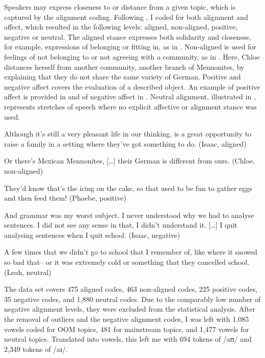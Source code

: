 \documentclass[output=paper]{langscibook}
\begin{document}
Speakers may express closeness to or distance from a given topic, which is captured by the alignment coding. Following \citet{nycz_stylistic_2018}, I coded for both alignment and affect, which resulted in the following levels: aligned, non-aligned, positive, negative or neutral. The aligned stance expresses both solidarity and closeness, for example, expressions of belonging or fitting in, as in . Non-aligned is used for feelings of not belonging to or not agreeing with a community, as in . Here, Chloe distances herself from another community, another branch of Mennonites, by explaining that they do not share the same variety of German. Positive and negative affect covers the evaluation of a described object. An example of positive affect is provided in  and of negative affect in . Neutral alignment, illustrated in , represents stretches of speech where no explicit affective or alignment stance was used.

\begin{exe}
    \ex\label{neuhausen:ex:4} Although it’s still a very pleasant life in our thinking, is a great opportunity to raise a family in a setting where they’ve got something to do. (Isaac, aligned)


    \ex\label{neuhausen:ex:5} Or there’s Mexican Mennonites, […] their German is different from ours. (Chloe, non-aligned)

    \ex\label{neuhausen:ex:6} They’d know that’s the icing on the cake, so that used to be fun to gather eggs and then feed them! (Phoebe, positive)
    
    \ex\label{neuhausen:ex:7} And grammar was my worst subject. I never understood why we had to analyse sentences. I did not see any sense in that, I didn’t understand it. […] I quit analysing sentences when I quit school. (Isaac, negative)

    \ex\label{neuhausen:ex:8} A few times that we didn’t go to school that I remember of, like where it snowed so bad that– or it was extremely cold or something that they cancelled school. (Leah, neutral)
\end{exe}


The data set covers 475 aligned codes, 463 non-aligned codes, 225 positive codes, 35 negative codes, and 1,880 neutral codes. Due to the comparably low number of negative alignment levels, they were excluded from the statistical analysis. After the removal of outliers and the negative alignment codes, I was left with 1,085 vowels coded for \gls*{OOM} topics, 481 for mainstream topics, and 1,477 vowels for neutral topics. Translated into vowels, this left me with 694 tokens of /aʊ/ and 2,349 tokens of /aɪ/. 
\end{document}
